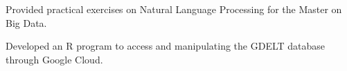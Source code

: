 \documentclass[]{deedy-resume-openfont}
\begin{document}
\begin{minipage}[t]{0.66\textwidth}
Provided practical exercises on Natural Language Processing for 
the Master on Big Data.
\sectionsep

\begin{tightemize}
\item Developed an R program to access and manipulating the GDELT database through Google Cloud.
\end{tightemize} 




\end{minipage} 
\end{document}
